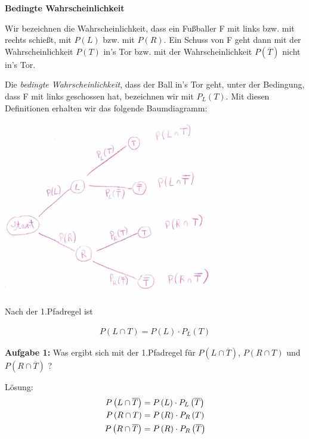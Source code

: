 \documentclass{article}
\begin{document}
\setcounter{section}{1}\setcounter{subsection}{0}

\textbf{Bedingte Wahrscheinlichkeit}

Wir bezeichnen die Wahrscheinlichkeit, dass ein Fußballer F mit links bzw. mit rechts schießt, mit $P\left(L\right)$ bzw. mit $P\left(R\right)$. Ein Schuss von F geht dann mit der Wahrscheinlichkeit $P\left(T\right)$ in's Tor bzw. mit der Wahrscheinlichkeit $P\left(\overline{T}\right)$ nicht in's Tor.

Die \textit{bedingte Wahrscheinlichkeit}, dass der Ball in's Tor geht, unter der Bedingung, dass F mit links geschossen hat, bezeichnen wir mit $P_L\left(T\right)$. Mit diesen Definitionen erhalten wir das folgende Baumdiagramm:

\begin{center}
\includegraphics[width=0.7\textwidth]{Baumdiagramm.png}
\end{center}

Nach der 1.Pfadregel ist

\begin{align}
\label{formelone} P\left(L\cap T\right) = P\left(L\right) \cdot P_L\left(T\right) 
\end{align}

\textbf{Aufgabe 1:} Was ergibt sich mit der 1.Pfadregel f\"ur $P\left(L\cap \overline{T}\right)$, $P\left(R\cap T\right)$ und $P\left(R\cap \overline{T}\right)$ ?

L\"osung:
\begin{align}
P\left(L\cap \overline{T}\right) &= P\left(L\right) \cdot P_L\left(\overline{T}\right) \notag \\ 
P\left(R\cap T\right) &= P\left(R\right) \cdot P_R\left(T\right) \notag \\
P\left(R\cap \overline{T}\right) &= P\left(R\right) \cdot P_R\left(\overline{T}\right) \notag   
\end{align}
\end{document}
